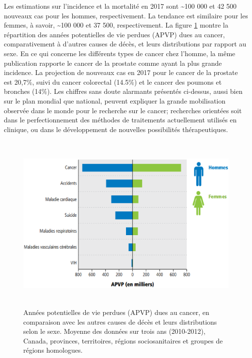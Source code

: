 %
Les estimations sur l’incidence et la mortalité en 2017 sont \textasciitilde 100 000 et 42 500 nouveaux cas pour les hommes, respectivement. La tendance est similaire pour les femmes, à savoir, \textasciitilde 100 000 et 37 500, respectivement. La figure \ref{FigureStatCancer2} \cite{StatCanada} montre la répartition des années potentielles de vie perdues (APVP)  dues au cancer, comparativement à d’autres causes de décès, et leurs distributions par rapport au sexe. En ce qui concerne les différents types de cancer chez l’homme, la même publication rapporte le cancer de la prostate comme ayant la plus grande incidence. La projection de nouveaux cas en 2017 pour le cancer de la prostate est 20,7\%, suivi du cancer colorectal (14.5\%) et le cancer des poumons et bronches (14\%). Les chiffres sans doute alarmants présentés ci-dessus, aussi bien sur le plan mondial que national, peuvent expliquer la grande mobilisation observée dans le monde pour le recherche sur le cancer; recherches orientées soit dans le perfectionnement des méthodes de traitements actuellement utilisés en clinique, ou dans le développement de nouvelles possibilités thérapeutiques.
%
\begin{figure}[h]
\centering
\includegraphics[width=14.0cm,height=9.0cm]{FigureStatCancer2.eps}
\caption{\label{FigureStatCancer2} Années potentielles de vie perdues (APVP) dues au cancer, en comparaison avec les autres causes de décès et leurs distributions selon le sexe. Moyenne des données sur trois ans (2010-2012), Canada, provinces, territoires, régions sociosanitaires et groupes de régions homologues.}
\end{figure}
%
